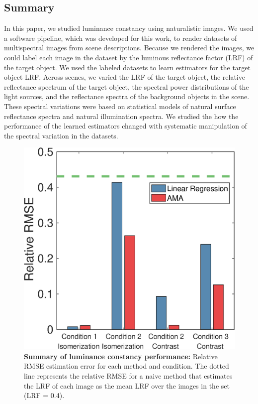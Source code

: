 \documentclass{jov}
\begin{document}
\subsection{Summary}
In this paper, we studied luminance constancy using naturalistic images.
We used a software pipeline, which was developed for this work, to render datasets of multispectral images from scene descriptions.
Because we rendered the images, we could label each image in the dataset by the luminous reflectance factor (LRF) of the target object.
We used the labeled datasets to learn estimators for the target object LRF.
Across scenes, we varied the LRF of the target object, the relative reflectance spectrum of the target object, 
the spectral power distributions of the light sources, and the reflectance spectra of the background objects in the scene.
These spectral variations were based on statistical models of natural surface reflectance spectra and natural illumination spectra.
We studied the how the performance of the learned estimators changed with systematic manipulation of the spectral variation in the datasets.

\begin{figure}
\centering
\includegraphics[width=\textwidth]{Figure14.eps}
\caption{{\bf Summary of luminance constancy performance:} Relative RMSE estimation error for each method and condition. The dotted line represents the relative RMSE for a naive method that estimates the LRF of each image as the mean LRF over the images in the set (LRF = 0.4).}
 \label{fig:barGraphs}
\end{figure}
\end{document}
